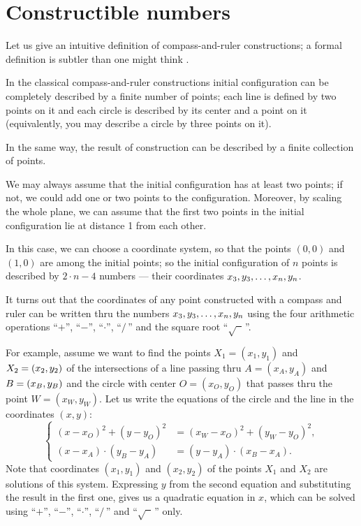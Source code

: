 %

\section{Constructible numbers}

Let us give an intuitive definition of compass-and-ruler constructions; a formal definition is subtler than one might think \cite{engeler}.

In the classical compass-and-ruler constructions initial configuration can be completely described by a finite number of points;
each line is defined by two points on it and each circle is described by its center and a point on it (equivalently, you may describe a circle by three points on it).

In the same way, the result of construction can be described by a finite collection of points.

We may always assume that the initial configuration has at least two points;
if not, we could add one or two points to the configuration.
Moreover, by scaling the whole plane, we can assume that the first two points in the initial configuration lie at distance 1 from each other.

In this case, we can choose a  coordinate system, 
so that the points $(0,0)$ and $(1,0)$ are among the initial points;
so the initial configuration of $n$ points is described by 
$2\cdot n-4$ numbers --- their coordinates $x_3,y_3,\z\dots,x_n,y_n$. 

\medskip

It turns out that the coordinates of any point constructed with a compass and ruler
can be written thru the numbers $x_3,y_3,\z\dots,x_n,y_n$ using the four arithmetic operations ``$+$'', ``$-$'', ``$\cdot$'', ``$/\,$''
and the square root ``$\sqrt{\phantom{a}}\,$''.

For example, assume we want to find the points $X_1=(x_1,y_1)$ and $X_2\z=(x_2,y_2)$ of the intersections of 
a line passing thru $A=(x_A,y_A)$ and $B\z=(x_B,y_B)$ and
the circle with center $O=(x_O,y_O)$ that passes thru the point $W=(x_W,y_W)$.
Let us write the equations of the circle and the line in the coordinates $(x,y)$:
$$
\left\{
\begin{aligned}
(x-x_O)^2+(y-y_O)^2&=(x_W-x_O)^2+(y_W-y_O)^2,
\\
(x-x_A)\cdot(y_B-y_A)&=(y-y_A)\cdot(x_B-x_A).
\end{aligned}
\right.
$$
Note that coordinates $(x_1,y_1)$ and $(x_2,y_2)$ of the points $X_1$ and $X_2$ are solutions of this system.
Expressing $y$ from the second equation and substituting the result in the first one, gives us a quadratic equation in $x$, 
which can be solved using ``$+$'', ``$-$'', ``$\cdot$'', ``$/\,$''
and  ``$\sqrt{\phantom{a}}\,$'' only.


